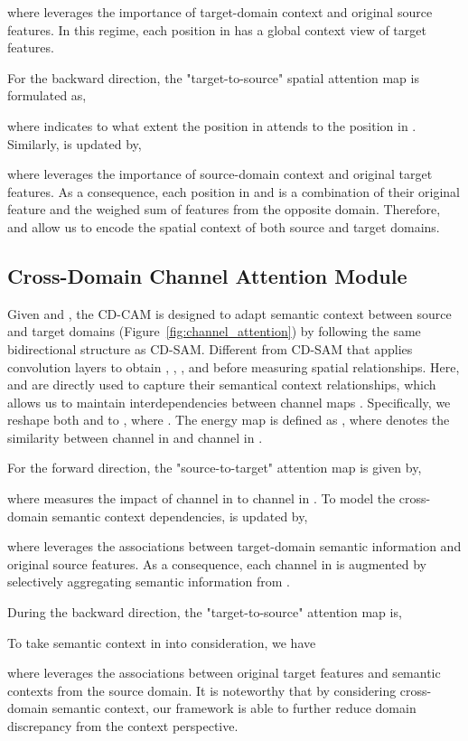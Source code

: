 \documentclass[10pt,twocolumn,letterpaper]{article}
\begin{document}
	where  leverages the importance of target-domain context and original source features. In this regime, each position in  has a global context view of target features.

	For the backward direction, the "target-to-source" spatial attention map is formulated as,
	
	where  indicates to what extent the  position in  attends to the  position in . Similarly,  is updated by,
	
	where  leverages the importance of source-domain context and original target features. As a consequence, each position in  and  is a combination of their original feature and the weighed sum of features from the opposite domain. Therefore,  and  allow us to encode the spatial context of both source and target domains.


	\subsection{Cross-Domain Channel Attention Module}

	Given  and , the CD-CAM is designed to adapt semantic context between source and target domains (Figure~\ref{fig:channel_attention}) by following the same bidirectional structure as CD-SAM. Different from CD-SAM that applies convolution layers to obtain , , , and  before measuring spatial relationships. Here,  and  are directly used to capture their semantical context relationships, which allows us to maintain interdependencies between channel maps \cite{fu2019dual}. Specifically, we reshape both  and  to , where . The energy map is defined as , where  denotes the similarity between  channel in  and  channel in .

	For the forward direction, the "source-to-target" attention map is given by,
	
	where  measures the impact of  channel in  to  channel in . To model the cross-domain semantic context dependencies,  is updated by,
	
	where  leverages the associations between target-domain semantic information and original source features. As a consequence, each channel in  is augmented by selectively aggregating semantic information from .

	During the backward direction, the "target-to-source" attention map is,
	
	To take semantic context in  into consideration, we have
	
	where  leverages the associations between original target features and semantic contexts from the source domain. It is noteworthy that by considering cross-domain semantic context, our framework is able to further reduce domain discrepancy from the context perspective.
\end{document}
